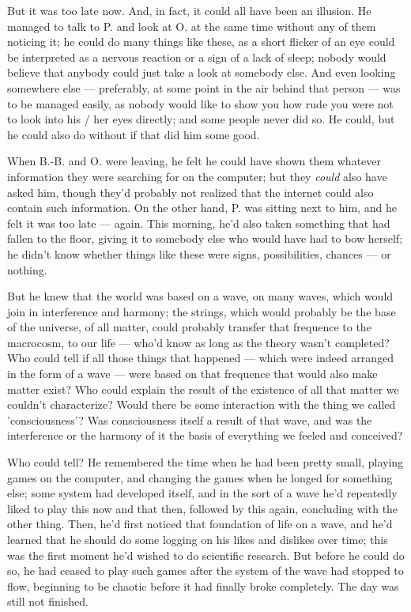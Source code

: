 But it was too late now. And, in fact, it could all have been an illusion. He managed to talk to P. and look at O. at the same time without any of them noticing it; he could do many things like these, as a short flicker of an eye could be interpreted as a nervous reaction or a sign of a lack of sleep; nobody would believe that anybody could just take a look at somebody else. And even looking somewhere else --- preferably, at some point in the air behind that person --- was to be managed easily, as nobody would like to show you how rude you were not to look into his / her eyes directly; and some people never did so. He could, but he could also do without if that did him some good.

When B.-B. and O. were leaving, he felt he could have shown them whatever information they were searching for on the computer; but they \emph{could} also have asked him, though they'd probably not realized that the internet could also contain such information. On the other hand, P. was sitting next to him, and he felt it was too late --- again. This morning, he'd also taken something that had fallen to the floor, giving it to somebody else who would have had to bow herself; he didn't know whether things like these were signs, possibilities, chances --- or nothing.

But he knew that the world was based on a wave, on many waves, which would join in interference and harmony; the strings, which would probably be the base of the universe, of all matter, could probably transfer that frequence to the macrocosm, to our life --- who'd know as long as the theory wasn't completed? Who could tell if all those things that happened --- which were indeed arranged in the form of a wave --- were based on that frequence that would also make matter exist? Who could explain the result of the existence of all that matter we couldn't characterize? Would there be some interaction with the thing we called 'consciousness'? Was consciousness itself a result of that wave, and was the interference or the harmony of it the basis of everything we feeled and conceived?

Who could tell? He remembered the time when he had been pretty small, playing games on the computer, and changing the games when he longed for something else; some system had developed itself, and in the sort of a wave he'd repeatedly liked to play this now and that then, followed by this again, concluding with the other thing. Then, he'd first noticed that foundation of life on a wave, and he'd learned that he should do some logging on his likes and dislikes over time; this was the first moment he'd wished to do scientific research. But before he could do so, he had ceased to play such games after the system of the wave had stopped to flow, beginning to be chaotic before it had finally broke completely.
The day was still not finished.

